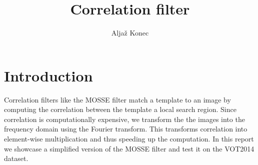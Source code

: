 \documentclass[9pt]{IEEEtran}
\title{\vspace{0ex} Correlation filter }
\author{Aljaž Konec\vspace{-4.0ex}}
\begin{document}
\maketitle

\section{Introduction}

Correlation filters like the MOSSE filter match a template to an image by computing the correlation between the template a local search region.
Since correlation is computationally expensive, we transform the the images into the frequency domain using the Fourier transform.
This transforms correlation into element-wise multiplication and thus speeding up the computation.
In this report we showcase a simplified version of the MOSSE filter and test it on the VOT2014 dataset.
\end{document}

